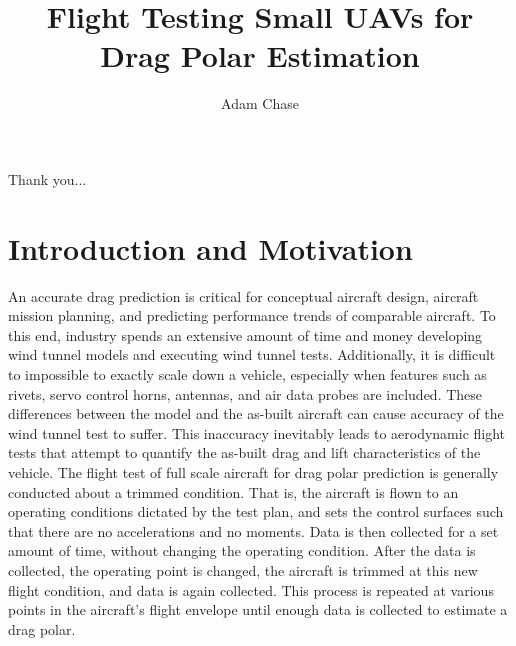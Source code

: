 \documentclass[12pt]{ucthesis}
\title{Flight Testing Small UAVs for Drag Polar Estimation}
\author{Adam Chase}
\begin{document}
\maketitle

\begin{frontmatter}
	
	\copyrightpage
	\committeemembershippage

\begin{abstract}


\end{abstract}

\begin{acknowledgements}

   Thank you...

\end{acknowledgements}


\tableofcontents


\listoftables

\listoffigures

\end{frontmatter}

\pagestyle{plain}




\renewcommand{\baselinestretch}{1.66}




\chapter{Introduction and Motivation}
\label{intro}
An accurate drag prediction is critical for conceptual aircraft design, aircraft mission planning, and predicting performance trends of comparable aircraft. To this end, industry spends an extensive amount of time and money developing wind tunnel models and executing wind tunnel tests. Additionally, it is difficult to impossible to exactly scale down a vehicle, especially when features such as rivets, servo control horns, antennas, and air data probes are included. These differences between the model and the as-built aircraft can cause accuracy of the wind tunnel test to suffer. This inaccuracy inevitably leads to aerodynamic flight tests that attempt to quantify the as-built drag and lift characteristics of the vehicle.
\indent
The flight test of full scale aircraft for drag polar prediction is generally conducted about a trimmed condition. That is, the aircraft is flown to an operating conditions dictated by the test plan, and sets the control surfaces such that there are no accelerations and no moments. Data is then collected for a set amount of time, without changing the operating condition. After the data is collected, the operating point is changed, the aircraft is trimmed at this new flight condition, and data is again collected. This process is repeated at various points in the aircraft's flight envelope until enough data is collected to estimate a drag polar.
\end{document}
